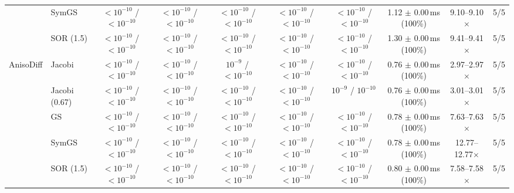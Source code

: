 {\begin{tabular}{llcccccccc}
 & SymGS & $<10^{-10}$ / $<10^{-10}$ & $<10^{-10}$ / $<10^{-10}$ & $<10^{-10}$ / $<10^{-10}$ & $<10^{-10}$ / $<10^{-10}$ & $<10^{-10}$ / $<10^{-10}$ & 1.12 $\pm$ 0.00\,ms (100\%) & 9.10--9.10$\times$ & 5/5 \\
 & SOR (1.5) & $<10^{-10}$ / $<10^{-10}$ & $<10^{-10}$ / $<10^{-10}$ & $<10^{-10}$ / $<10^{-10}$ & $<10^{-10}$ / $<10^{-10}$ & $<10^{-10}$ / $<10^{-10}$ & 1.30 $\pm$ 0.00\,ms (100\%) & 9.41--9.41$\times$ & 5/5 \\
\midrule
AnisoDiff & Jacobi & $<10^{-10}$ / $<10^{-10}$ & $<10^{-10}$ / $<10^{-10}$ & $10^{-9}$ / $<10^{-10}$ & $<10^{-10}$ / $<10^{-10}$ & $<10^{-10}$ / $<10^{-10}$ & 0.76 $\pm$ 0.00\,ms (100\%) & 2.97--2.97$\times$ & 5/5 \\
 & Jacobi (0.67) & $<10^{-10}$ / $<10^{-10}$ & $<10^{-10}$ / $<10^{-10}$ & $<10^{-10}$ / $<10^{-10}$ & $<10^{-10}$ / $<10^{-10}$ & $10^{-9}$ / $10^{-10}$ & 0.76 $\pm$ 0.00\,ms (100\%) & 3.01--3.01$\times$ & 5/5 \\
 & GS & $<10^{-10}$ / $<10^{-10}$ & $<10^{-10}$ / $<10^{-10}$ & $<10^{-10}$ / $<10^{-10}$ & $<10^{-10}$ / $<10^{-10}$ & $<10^{-10}$ / $<10^{-10}$ & 0.78 $\pm$ 0.00\,ms (100\%) & 7.63--7.63$\times$ & 5/5 \\
 & SymGS & $<10^{-10}$ / $<10^{-10}$ & $<10^{-10}$ / $<10^{-10}$ & $<10^{-10}$ / $<10^{-10}$ & $<10^{-10}$ / $<10^{-10}$ & $<10^{-10}$ / $<10^{-10}$ & 0.78 $\pm$ 0.00\,ms (100\%) & 12.77--12.77$\times$ & 5/5 \\
 & SOR (1.5) & $<10^{-10}$ / $<10^{-10}$ & $<10^{-10}$ / $<10^{-10}$ & $<10^{-10}$ / $<10^{-10}$ & $<10^{-10}$ / $<10^{-10}$ & $<10^{-10}$ / $<10^{-10}$ & 0.80 $\pm$ 0.00\,ms (100\%) & 7.58--7.58$\times$ & 5/5 \\
\bottomrule
\end{tabular}}
